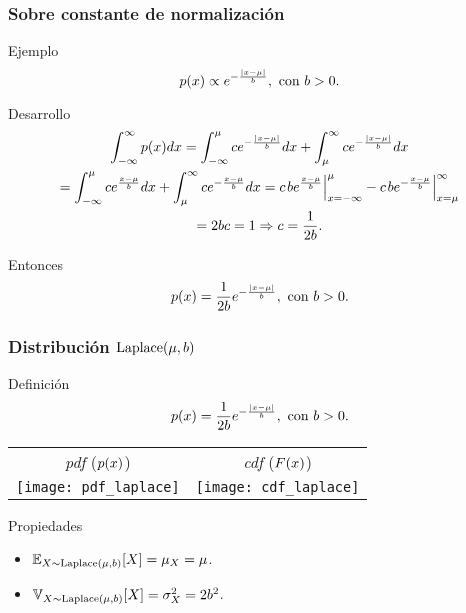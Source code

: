 \documentclass[table]{beamer}
\begin{document}
\begin{frame}
    \frametitle{Sobre constante de normalización}
    \begin{exampleblock}{Ejemplo}
        \begin{equation*}
            \pdf{x} \propto e^{- \frac{\vparens{x - \mu}}{b} } , \text{ con } b > 0 .
        \end{equation*}
    \end{exampleblock}
    \begin{block}{Desarrollo}
        \begin{multline*}
            \int_{- \infty}^{\infty} \pdf{x} d x
            = \int_{- \infty}^{\mu} c e^{- \frac{\vparens{x - \mu}}{b}} d x + \int_{\mu}^{\infty} c e^{- \frac{\vparens{x - \mu}}{b}} d x
            \\
            = \int_{- \infty}^{\mu} c e^{\frac{x - \mu}{b}} d x + \int_{\mu}^{\infty} c e^{- \frac{x - \mu}{b}} d x
            = c \evalparens{b e^{\frac{x - \mu}{b}}}_{x = - \infty}^{\mu}
            - c \evalparens{b e^{- \frac{x - \mu}{b}}}_{x = \mu}^{\infty}
            \\
            = 2 b c = 1
            \Rightarrow c = \frac{1}{2 b} .
        \end{multline*}
    \end{block}
    \begin{block}{Entonces}
        \begin{equation*}
            \pdf{x} = \frac{1}{2 b} e^{- \frac{\vparens{x - \mu}}{b}} , \text{ con } b > 0 .
        \end{equation*}
    \end{block}
\end{frame}



\begin{frame}
    \frametitle{Distribución $\laplace{\mu}{b}$}
    \begin{block}{Definición}
        \begin{equation*}
            \pdf{x} = \frac{1}{2 b} e^{- \frac{\vparens{x - \mu}}{b}} , \text{ con } b > 0 .
        \end{equation*}
    \end{block}
    \begin{center}
        \begin{tabular}{cc}
            \emph{pdf} ($\pdf{x}$) & \emph{cdf} ($\FF{x}$) \\
            \texttt{[image: pdf\_laplace]} &
            \texttt{[image: cdf\_laplace]}
        \end{tabular}
    \end{center}
    \begin{block}{Propiedades}
        \begin{itemize}
            \item $\expecteddist{X \sim \laplace{\mu}{b}}{X} = \mu_{X} = \mu$.
            \item $\variancedist{X \sim \laplace{\mu}{b}}{X} = \sigma^{2}_{X} = 2 b^{2}$.
        \end{itemize}
    \end{block}
\end{frame}
\end{document}
